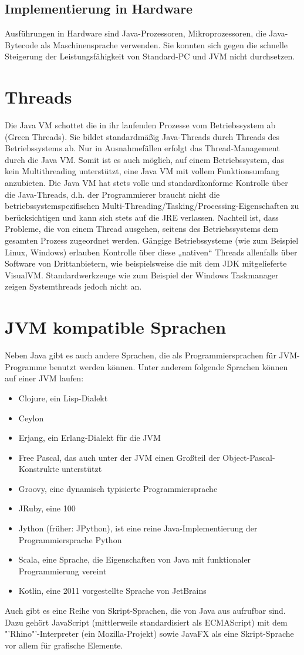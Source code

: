 \documentclass[a4paper,14pt]{scrreprt}
\begin{document}
\subsection{Implementierung in Hardware}
Ausführungen in Hardware sind Java-Prozessoren, Mikroprozessoren, die Java-Bytecode als Maschinensprache verwenden. Sie konnten sich gegen die schnelle Steigerung der Leistungsfähigkeit von Standard-PC und JVM nicht durchsetzen.
\section{Threads}
Die Java VM schottet die in ihr laufenden Prozesse vom Betriebssystem ab (Green Threads). Sie bildet standardmäßig Java-Threads durch Threads des Betriebssystems ab. Nur in Ausnahmefällen erfolgt das Thread-Management durch die Java VM. Somit ist es auch möglich, auf einem Betriebssystem, das kein Multithreading unterstützt, eine Java VM mit vollem Funktionsumfang anzubieten.
Die Java VM hat stets volle und standardkonforme Kontrolle über die Java-Threads, d.h. der Programmierer braucht nicht die betriebssystemspezifischen Multi-Threading/Tasking/Processing-Eigenschaften zu berücksichtigen und kann sich stets auf die JRE verlassen. Nachteil ist, dass Probleme, die von einem Thread ausgehen, seitens des Betriebssystems dem gesamten Prozess zugeordnet werden. Gängige Betriebssysteme (wie zum Beispiel Linux, Windows) erlauben Kontrolle über diese „nativen“ Threads allenfalls über Software von Drittanbietern, wie beispielsweise die mit dem JDK mitgelieferte VisualVM. Standardwerkzeuge wie zum Beispiel der Windows Taskmanager zeigen Systemthreads jedoch nicht an.
\section{JVM kompatible Sprachen}
Neben Java gibt es auch andere Sprachen, die als Programmiersprachen für JVM-Programme benutzt werden können. Unter anderem folgende Sprachen können auf einer JVM laufen:
\begin{itemize}
\item Clojure, ein Lisp-Dialekt
\item Ceylon
\item Erjang, ein Erlang-Dialekt für die JVM
\item Free Pascal, das auch unter der JVM einen Großteil der Object-Pascal-Konstrukte unterstützt
\item Groovy, eine dynamisch typisierte Programmiersprache
\item JRuby, eine 100 %
\item Jython (früher: JPython), ist eine reine Java-Implementierung der Programmiersprache Python
\item Scala, eine Sprache, die Eigenschaften von Java mit funktionaler Programmierung vereint
\item Kotlin, eine 2011 vorgestellte Sprache von JetBrains
\end{itemize}
Auch gibt es eine Reihe von Skript-Sprachen, die von Java aus aufrufbar sind. Dazu gehört JavaScript (mittlerweile standardisiert als ECMAScript) mit dem "'Rhino"'-Interpreter (ein Mozilla-Projekt) sowie JavaFX als eine Skript-Sprache vor allem für grafische Elemente.\cite{jvmEin}\cite{jvmEin1}
\end{document}

